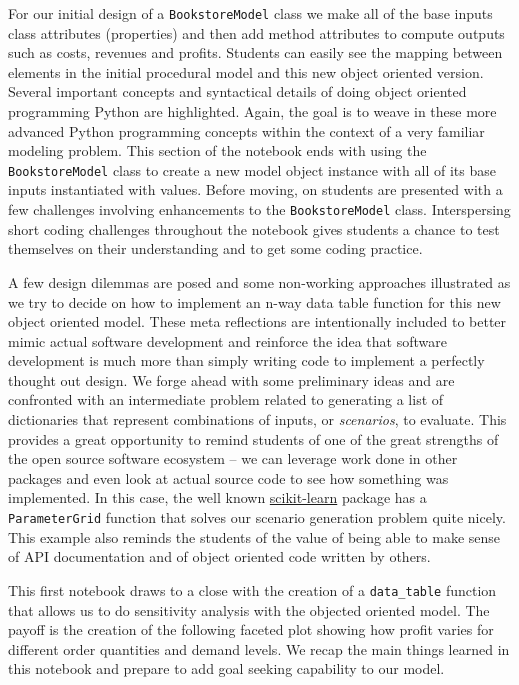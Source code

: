\documentclass[ited,blindrev]{informs3}              %
\newcommand{\code}[1]{\texttt{#1}}
\begin{document}
For our initial design of a \code{BookstoreModel} class we make all of the base inputs class attributes (properties) and then add method attributes to compute outputs such as costs, revenues and profits. Students can easily see the mapping between elements in the initial procedural model and this new object oriented version. Several important concepts and syntactical details of doing object oriented programming Python are highlighted. Again, the goal is to weave in these more advanced Python programming concepts within the context of a very familiar modeling problem. This section of the notebook ends with using the \code{BookstoreModel} class to create a new model object instance with all of its base inputs instantiated with values. Before moving, on students are presented with a few challenges involving enhancements to the \code{BookstoreModel} class. Interspersing short coding challenges throughout the notebook gives students a chance to test themselves on their understanding and to get some coding practice.

A few design dilemmas are posed and some non-working approaches illustrated as we try to decide on how to implement an n-way data table function for this new object oriented model. These meta reflections are intentionally included to better mimic actual software development and reinforce the idea that software development is much more than simply writing code to implement a perfectly thought out design. We forge ahead with some preliminary ideas and are confronted with an intermediate problem related to generating a list of dictionaries that represent combinations of inputs, or \textit{scenarios}, to evaluate. This provides a great opportunity to remind students of one of the great strengths of the open source software ecosystem -- we can leverage work done in other packages and even look at actual source code to see how something was implemented. In this case, the well known \href{https://scikit-learn.org/stable/}{scikit-learn} package \cite{ScikitlearnMachineLearning} has a \code{ParameterGrid} function that solves our scenario generation problem quite nicely. This example also reminds the students of the value of being able to make sense of API documentation and of object oriented code written by others. 

This first notebook draws to a close with the creation of a \code{data\_table} function that allows us to do sensitivity analysis with the objected oriented model. The payoff is the creation of the following faceted plot showing how profit varies for different order quantities and demand levels. We recap the main things learned in this notebook and prepare to add goal seeking capability to our model.
\end{document}
